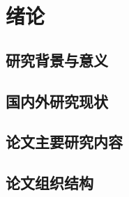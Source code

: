 \section{绪论}

\subsection{研究背景与意义}

\subsection{国内外研究现状}

\subsection{论文主要研究内容}

\subsection{论文组织结构}

